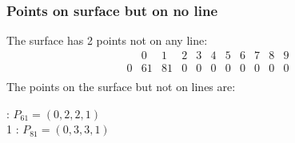\documentclass{article}
\begin{document}
{\subsubsection*{Points on surface but on no line}
The surface has 2 points not on any line:\\
$$
\begin{array}{r|*{10}{r}}
 & 0 & 1 & 2 & 3 & 4 & 5 & 6 & 7 & 8 & 9\\
\hline
0 & 61 & 81 & 0 & 0 & 0 & 0 & 0 & 0 & 0 & 0\\
\end{array}
$$
The points on the surface but not on lines are:\\
\begin{multicols}{2}
 : $P_{61}=( 0, 2, 2, 1 )$\\
1 : $P_{81}=( 0, 3, 3, 1 )$\\
\end{multicols}
}
\end{document}
